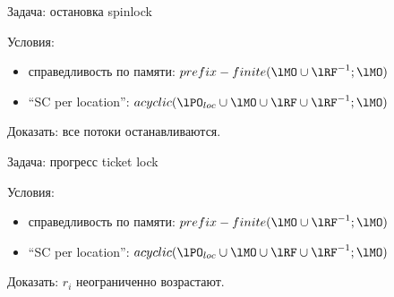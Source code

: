 \begin{frame}{Задача: остановка spinlock}

  \vspace{0.5cm}

  Условия:
  \begin{itemize}
  \item справедливость по памяти: $prefix - finite (\lMO \cup \lRF^{-1};\lMO)$
  \item ``SC per location'': $acyclic(\lPO_{loc} \cup \lMO \cup \lRF \cup \lRF^{-1};\lMO)$
  \end{itemize}

  Доказать: все потоки останавливаются.
\end{frame}

\begin{frame}{Задача: прогресс ticket lock}

  \vspace{0.5cm}

  Условия:
  \begin{itemize}
  \item справедливость по памяти: $prefix - finite (\lMO \cup \lRF^{-1};\lMO)$
  \item ``SC per location'': $acyclic(\lPO_{loc} \cup \lMO \cup \lRF \cup \lRF^{-1};\lMO)$
  \end{itemize}

  Доказать: $r_i$ неограниченно возрастают.
\end{frame}

